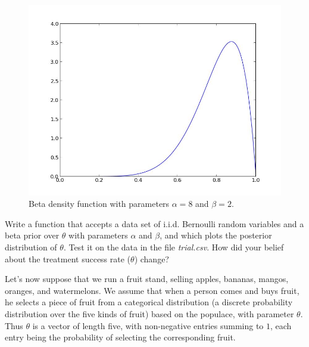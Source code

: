 \begin{figure}[h]
\centering
\includegraphics[height=\textwidth]{beta.jpeg}
\caption{Beta density function with parameters $\alpha = 8$ and $\beta = 2$.}
\end{figure}

\begin{problem}
Write a function that accepts a data set of i.i.d. Bernoulli random variables and a beta prior over $\theta$ with parameters $\alpha$ and $\beta$, and which plots the posterior distribution of $\theta$. Test it on the data in the file \emph{trial.csv}. How did your belief about the treatment success rate ($\theta$) change?
\end{problem}

Let's now suppose that we run a fruit stand, selling apples, bananas, mangos, oranges, and watermelons. We assume that when a person comes and buys fruit, he selects a piece of fruit from a categorical distribution (a discrete probability distribution over the five kinds of fruit) based on the populace, with parameter $\theta$. Thus $\theta$ is a vector of length five, with non-negative entries summing to $1$, each entry being the probability of selecting the corresponding fruit.

